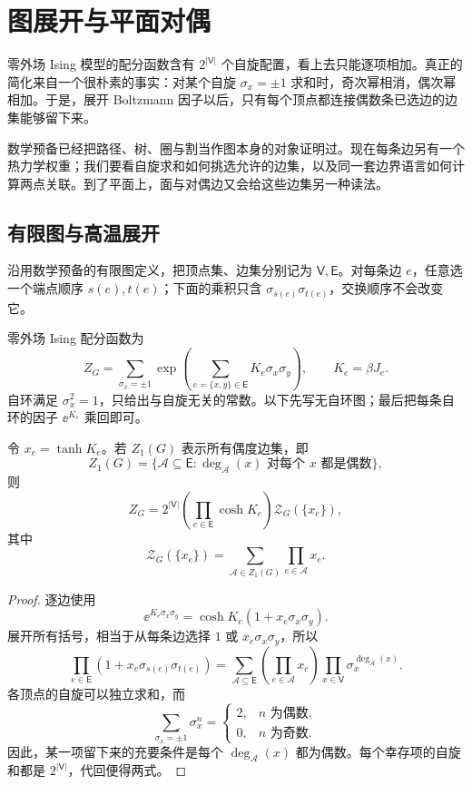 \section{图展开与平面对偶}
\label{chap:ising-graph-duality}

零外场 Ising 模型的配分函数含有 \(2^{|\mathsf V|}\) 个自旋配置，看上去只能逐项相加。真正的简化来自一个很朴素的事实：对某个自旋 \(\sigma_x=\pm1\) 求和时，奇次幂相消，偶次幂相加。于是，展开 Boltzmann 因子以后，只有每个顶点都连接偶数条已选边的边集能够留下来。

数学预备已经把路径、树、圈与割当作图本身的对象证明过。现在每条边另有一个热力学权重；我们要看自旋求和如何挑选允许的边集，以及同一套边界语言如何计算两点关联。到了平面上，面与对偶边又会给这些边集另一种读法。

\subsection{有限图与高温展开}
\label{sec:phys-sm-high-temp}

沿用数学预备的有限图定义，把顶点集、边集分别记为 \(\mathsf V,\mathsf E\)。对每条边 \(e\)，任意选一个端点顺序 \(s(e),t(e)\)；下面的乘积只含 \(\sigma_{s(e)}\sigma_{t(e)}\)，交换顺序不会改变它。

零外场 Ising 配分函数为
\[
Z_G=\sum_{\sigma_x=\pm1}
\exp\!\left(\sum_{e=\{x,y\}\in\mathsf E}K_e\sigma_x\sigma_y\right),
\qquad K_e=\beta J_e.
\]
自环满足 \(\sigma_x^2=1\)，只给出与自旋无关的常数。以下先写无自环图；最后把每条自环的因子 \(\ee^{K_e}\) 乘回即可。

\begin{proposition}
令 \(x_e=\tanh K_e\)。若 \(Z_1(G)\) 表示所有偶度边集，即
\[
Z_1(G)=\{\mathscr A\subseteq\mathsf E:
\deg_{\mathscr A}(x)\text{ 对每个 }x\text{ 都是偶数}\},
\]
则
\begin{equation}
Z_G
=2^{|\mathsf V|}\left(\prod_{e\in\mathsf E}\cosh K_e\right)
\mathcal Z_G(\{x_e\}),
\label{eq:phys-sm-high-temp-z}
\end{equation}
其中
\begin{equation}
\mathcal Z_G(\{x_e\})
=\sum_{\mathscr A\in Z_1(G)}\prod_{e\in\mathscr A}x_e.
\label{eq:phys-sm-kw-even-subgraph-polynomial}
\end{equation}
\end{proposition}

\begin{proof}
逐边使用
\[
\ee^{K_e\sigma_x\sigma_y}
=\cosh K_e\left(1+x_e\sigma_x\sigma_y\right).
\]
展开所有括号，相当于从每条边选择 \(1\) 或
\(x_e\sigma_x\sigma_y\)，所以
\[
\prod_{e\in\mathsf E}
(1+x_e\sigma_{s(e)}\sigma_{t(e)})
=\sum_{\mathscr A\subseteq\mathsf E}
\left(\prod_{e\in\mathscr A}x_e\right)
\prod_{x\in\mathsf V}\sigma_x^{\deg_{\mathscr A}(x)}.
\]
各顶点的自旋可以独立求和，而
\[
\sum_{\sigma_x=\pm1}\sigma_x^n
=\begin{cases}2,&n\text{ 为偶数},\\0,&n\text{ 为奇数}.
\end{cases}
\]
因此，某一项留下来的充要条件是每个
\(\deg_{\mathscr A}(x)\) 都为偶数。每个幸存项的自旋和都是
\(2^{|\mathsf V|}\)，代回便得两式。
\end{proof}

